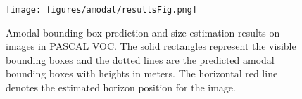 \begin{figure}[htb!]
  \centering
  \texttt{[image: figures/amodal/resultsFig.png]}

\caption{ Amodal bounding box prediction and size estimation results on images in PASCAL VOC. The solid rectangles represent the visible bounding boxes and the dotted lines are the predicted amodal bounding boxes with heights in meters. The horizontal red line denotes the estimated horizon position for the image.}
\end{figure}